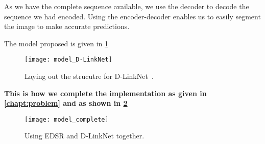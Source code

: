 As we have the complete sequence available, we use the decoder to decode the sequence we had encoded. Using the encoder-decoder enables us to easily segment the image to make accurate predictions.

The model proposed is given in \cref{fig:model_D-LinkNet}
\begin{figure}[h!]
  \centering
  \texttt{[image: model\_D-LinkNet]}
  \caption[Laying out the strucutre for D-LinkNet]{Laying out the strucutre for D-LinkNet~\cite{D-LinkNet}.}
  \label{fig:model_D-LinkNet}
\end{figure}


\textbf{This is how we complete the implementation as given in \cref{chapt:problem} and as shown in \cref{fig:model_complete}}

\begin{figure}[h!]
  \centering
  \texttt{[image: model\_complete]}
  \caption{Using EDSR and D-LinkNet together.}
  \label{fig:model_complete}
\end{figure}